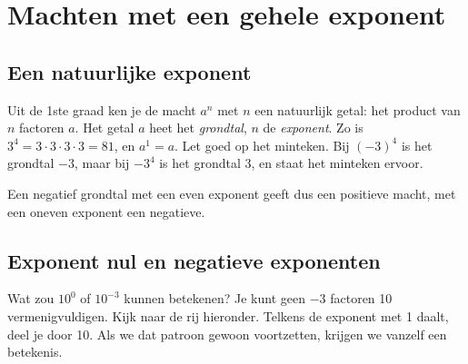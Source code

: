\begin{oefeningen}[Start]

\end{oefeningen}

\section{Machten met een gehele exponent}

\subsection{Een natuurlijke exponent}

Uit de 1ste graad ken je de macht $a^n$ met $n$ een natuurlijk getal: het product van $n$ factoren $a$. Het getal $a$ heet het \textit{grondtal}, $n$ de \textit{exponent}. Zo is $3^4 = 3 \cdot 3 \cdot 3 \cdot 3 = 81$, en $a^1 = a$. Let goed op het minteken. Bij $(-3)^4$ is het grondtal $-3$, maar bij $-3^4$ is het grondtal 3, en staat het minteken ervoor.


Een negatief grondtal met een even exponent geeft dus een positieve macht, met een oneven exponent een negatieve.

\subsection{Exponent nul en negatieve exponenten}

Wat zou $10^0$ of $10^{-3}$ kunnen betekenen? Je kunt geen $-3$ factoren 10 vermenigvuldigen. Kijk naar de rij hieronder. Telkens de exponent met 1 daalt, deel je door 10. Als we dat patroon gewoon voortzetten, krijgen we vanzelf een betekenis.

